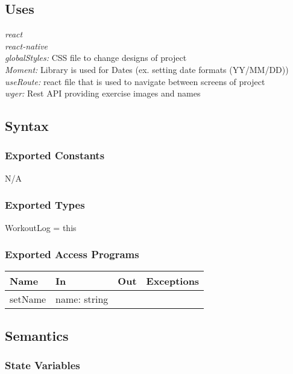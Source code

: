 \documentclass[12pt, titlepage]{article}
\begin{document}
\subsection{Uses}
{\textit{react}}\\
{\textit{react-native}}\\
{\textit{globalStyles:} CSS file to change designs of project}\\
{\textit{Moment:} Library is used for Dates (ex. setting date formats (YY/MM/DD))}\\
{\textit{useRoute:} react file that is used to navigate between screens of project}\\
{\textit{wger:} Rest API providing exercise images and names}\\

\subsection{Syntax}

\subsubsection{Exported Constants}
N/A

\subsubsection{Exported Types}
WorkoutLog = this

\subsubsection{Exported Access Programs}

\begin{tabular}{| l | l | l | l |}
	\hline
	{\textbf{Name}} & {\textbf{In}} & {\textbf{Out}} & {\textbf{Exceptions}}\\
	\hline
	{setName} & name: string & & \\
    \hline
\end{tabular}

\subsection{Semantics}

\subsubsection{State Variables}
\end{document}
